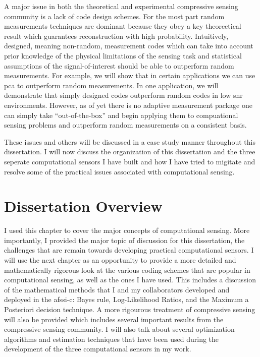 A major issue in both the theoretical and experimental compressive sensing community is a lack of code design schemes. For the most part random measurements techniques are dominant because they obey a key theorectical result which guarantees reconstruction with high probability. Intuitively, designed, meaning non-random, measurement codes which can take into account prior knowledge of the physical limitations of the sensing task and statistical assumptions of the signal-of-interest should be able to outperform random measurements. For example, we will show that in certain applications we can use \gls{pca} to outperform random measurements. In one application, we will demonstrate that simply designed codes outperform random codes in low \gls{snr} environments. However, as of yet there is no adaptive measurement package one can simply take  ``out-of-the-box'' and begin applying them to compuational sensing problems and outperform random measurements on a consistent basis.

These issues and others will be discussed in a case study manner throughout this dissertation. I will now discuss the organization of this dissertation and the three seperate computational sensors I have built and how I have tried to migitate and resolve some of the practical issues associated with computational sensing.

\section{Dissertation Overview}

I used this chapter to cover the major concepts of computational sensing. More importantly, I provided the major topic of discussion for this dissertation, the challenges that are remain towards developing practical computational sensors. I will use the next chapter as an opportunity to provide a more detailed and mathematically rigorous look at the various coding schemes that are popular in computational sensing, as well as the ones I have used. This includes a discussion of the mathematical methods that I and my collaborators developed and deployed in the \gls{afssi-c}: Bayes rule, Log-Likelihood Ratios, and the Maximum a Posteriori decision technique. A more rigourous treatment of compressive sensing will also be provided which includes several important results from the compressive sensing community. I will also talk about several optimization algorithms and estimation techniques that have been used during the development of the three computational sensors in my work.

